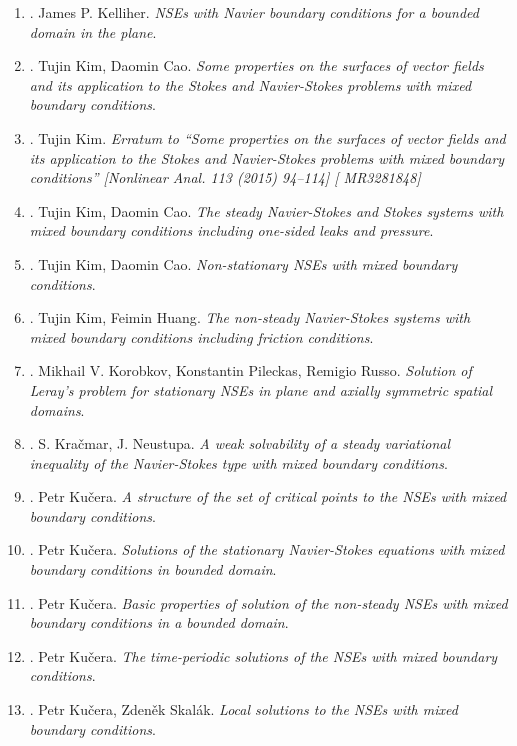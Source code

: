 \documentclass{article}
\begin{document}
\begin{enumerate}
	\item \cite{Kelliher2006}. {\sc James P. Kelliher}. {\it NSEs with Navier boundary conditions for a bounded domain in the plane}.
	\item \cite{Kim_Cao2015}. {\sc Tujin Kim, Daomin Cao}. {\it Some properties on the surfaces of vector fields and its application to the Stokes and Navier-Stokes problems with mixed boundary conditions}.
	\item \cite{Kim2016}. {\sc Tujin Kim}. {\it Erratum to ``Some properties on the surfaces of vector fields and its application to the Stokes and Navier-Stokes problems with mixed boundary conditions'' [{N}onlinear {A}nal. 113 (2015) 94--114] [ {MR}3281848]}
	\item \cite{Kim_Cao2016}. {\sc Tujin Kim, Daomin Cao}. {\it The steady {N}avier-{S}tokes and Stokes systems with mixed boundary conditions including one-sided leaks and pressure}.
	\item \cite{Kim_Cao2017}. {\sc Tujin Kim, Daomin Cao}. {\it Non-stationary NSEs with mixed boundary conditions}.
	\item \cite{Kim_Huang2018}. {\sc Tujin Kim, Feimin Huang}. {\it The non-steady Navier-Stokes systems with mixed boundary conditions including friction conditions}.
	\item \cite{Korobkov_Pileckas_Russo2015}. {\sc Mikhail V. Korobkov, Konstantin Pileckas, Remigio Russo}. {\it Solution of Leray's problem for stationary NSEs in plane and axially symmetric spatial domains}.
	\item \cite{Kracmar_Neustupa2001}. {\sc S. Kra\v{c}mar, J. Neustupa}. {\it A weak solvability of a steady variational inequality of the Navier-Stokes type with mixed boundary conditions}.
	\item \cite{Kucera1998a}. {\sc Petr Ku\v{c}era}. {\it A structure of the set of critical points to the NSEs with mixed boundary conditions}.
	\item \cite{Kucera1998b}. {\sc Petr Ku\v{c}era}. {\it Solutions of the stationary Navier-Stokes equations with mixed boundary conditions in bounded domain}.
	\item \cite{Kucera2009}. {\sc Petr Ku\v{c}era}. {\it Basic properties of solution of the non-steady NSEs with mixed boundary conditions in a bounded domain}.
	\item \cite{Kucera2010}. {\sc Petr Ku\v{c}era}. {\it The time-periodic solutions of the NSEs with mixed boundary conditions}.
	\item \cite{Kucera_Skalak1998}. {\sc Petr Ku\v{c}era, Zden\v{e}k Skal\'{a}k}. {\it Local solutions to the NSEs with mixed boundary conditions}.

\end{enumerate}
\end{document}
